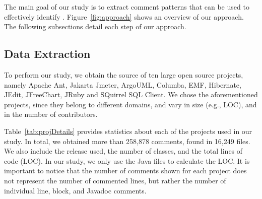 The main goal of our study is to extract comment patterns that can be used to effectively identify \SADTD. Figure~\ref{fig:approach} shows an overview of our approach. The following subsections detail each step of our approach.
 
\subsection{Data Extraction}

To perform our study, we obtain the source of ten large open source projects, namely Apache Ant, Jakarta Jmeter, ArgoUML,  Columba, EMF, Hibernate, JEdit, JFreeChart, JRuby and SQuirrel SQL Client. We chose the aforementioned projects, since they belong to different domains, and vary in size (e.g., LOC), and in the number of contributors.

Table~\ref{tab:projDetails} provides statistics about each of the projects used in our study. In total, we obtained more than 258,878 comments, found in 16,249 files. We also include the release used, the number of classes, and the total lines of code (LOC). In our study, we only use the Java files to calculate the LOC. It is important to notice that the number of comments shown for each project does not represent the number of commented lines, but rather the number of individual line, block, and Javadoc comments. 


